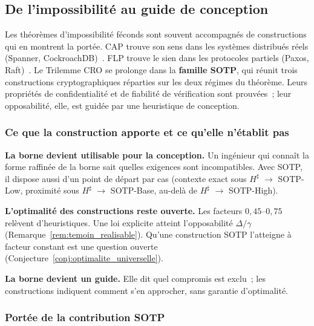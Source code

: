 \subsection{De l'impossibilit\'e au guide de conception}
\label{subsec:portee_constructive}
\begin{sloppypar}

Les th\'eor\`emes d'impossibilit\'e f\'econds sont souvent accompagn\'es de
constructions qui en montrent la port\'ee. CAP trouve son sens dans les
syst\`emes distribu\'es r\'eels (Spanner, CockroachDB)~\cite{Brewer00,GilbertLynch02}.
FLP trouve le sien dans les protocoles partiels (Paxos,
Raft)~\cite{FLP85}. Le Trilemme CRO se prolonge dans la
\textbf{famille SOTP}, qui r\'eunit trois constructions cryptographiques r\'eparties sur les deux
r\'egimes du th\'eor\`eme. Leurs propri\'et\'es de confidentialit\'e et de
fiabilit\'e de v\'erification sont prouv\'ees~; leur opposabilit\'e, elle, est
guid\'ee par une heuristique de conception.

\subsubsection{Ce que la construction apporte et ce qu'elle n'\'etablit pas}

\textbf{La borne devient utilisable pour la conception.} Un ing\'enieur qui
conna\^it la forme raffin\'ee de la borne sait quelles exigences sont
incompatibles. Avec SOTP, il dispose aussi d'un point de d\'epart par
cas (contexte exact sous $H^\sharp$ $\to$ SOTP-Low, proximit\'e sous $H^\sharp$ $\to$ SOTP-Base,
au-del\`a de $H^\sharp$ $\to$ SOTP-High).

\textbf{L'optimalit\'e des constructions reste ouverte.} Les facteurs $0{,}45$--$0{,}75$ rel\`event
d'heuristiques. Une loi explicite atteint l'opposabilit\'e $\Delta/\gamma$
(Remarque~\ref{rem:temoin_realisable}). Qu'une construction SOTP l'atteigne \`a
facteur constant est une question ouverte (Conjecture~\ref{conj:optimalite_universelle}).

\textbf{La borne devient un guide.} Elle dit
quel compromis est exclu~; les constructions indiquent comment s'en
approcher, sans garantie d'optimalit\'e.

\subsubsection{Port\'ee de la contribution SOTP}


\end{sloppypar}
